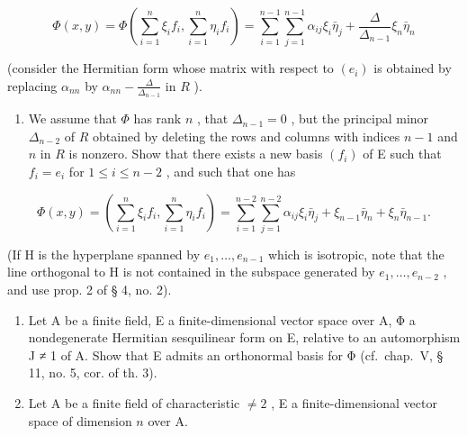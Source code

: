 \[
\Phi (x, y) = \Phi \left(\sum_ {i = 1} ^ {n} \xi_ {i} f _ {i}, \sum_ {i = 1} ^ {n} \eta_ {i} f _ {i}\right) = \sum_ {i = 1} ^ {n - 1} \sum_ {j = 1} ^ {n - 1} \alpha_ {i j} \xi_ {i} \bar {\eta} _ {j} + \frac {\Delta}{\Delta_ {n - 1}} \xi_ {n} \bar {\eta} _ {n}
\]

(consider the Hermitian form whose matrix with respect to \((e_i)\) is obtained by replacing \(\alpha_{nn}\) by \(\alpha_{nn} - \frac{\Delta}{\Delta_{n-1}}\) in \(R\) ).

\begin{enumerate}
\def\labelenumi{\alph{enumi})}
\setcounter{enumi}{2}
\tightlist
\item
  We assume that \(\Phi\) has rank \(n\) , that \(\Delta_{n-1} = 0\) , but the principal minor \(\Delta_{n-2}\) of \(R\) obtained by deleting the rows and columns with indices \(n-1\) and \(n\) in \(R\) is nonzero. Show that there exists a new basis \((f_i)\) of E such that \(f_i = e_i\) for \(1 \leqslant i \leqslant n-2\) , and such that one has
\end{enumerate}

\[
\Phi (x, y) = (\sum_ {i = 1} ^ {n} \xi_ {i} f _ {i}, \sum_ {i = 1} ^ {n} \eta_ {i} f _ {i}) = \sum_ {i = 1} ^ {n - 2} \sum_ {j = 1} ^ {n - 2} \alpha_ {i j} \xi_ {i} \bar {\eta} _ {j} + \xi_ {n - 1} \bar {\eta} _ {n} + \xi_ {n} \bar {\eta} _ {n - 1}.
\]

(If H is the hyperplane spanned by \(e_{1},\ldots,e_{n-1}\) which is isotropic, note that the line orthogonal to H is not contained in the subspace generated by \(e_{1},\ldots,e_{n-2}\) , and use prop. 2 of § 4, no. 2).

\begin{enumerate}
\def\labelenumi{\arabic{enumi})}
\setcounter{enumi}{2}
\item
  Let A be a finite field, E a finite-dimensional vector space over A, Φ a nondegenerate Hermitian sesquilinear form on E, relative to an automorphism J ≠ 1 of A. Show that E admits an orthonormal basis for Φ (cf.~chap.~V, § 11, no. 5, cor. of th. 3).
\item
  Let A be a finite field of characteristic \(\neq 2\) , E a finite-dimensional vector space of dimension \(n\) over A.
\end{enumerate}

